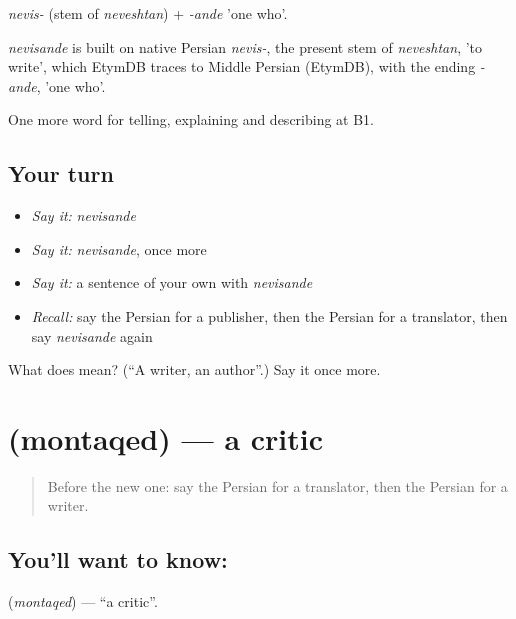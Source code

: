 \emph{nevis-} (stem of \emph{neveshtan}) + \emph{-ande} 'one who'.

\begin{cousinweb}
\emph{nevisande} is built on native Persian \emph{nevis-}, the present stem of \emph{neveshtan}, 'to write', which EtymDB traces to Middle Persian (EtymDB), with the ending \emph{-ande}, 'one who'.
\end{cousinweb}

\begin{grammarlens}[title={What you've built}]
One more word for telling, explaining and describing at B1.
\end{grammarlens}

\subsection*{Your turn}
\begin{itemize}
\raggedright
  \item \emph{Say it:} \emph{nevisande}
  \item \emph{Say it:} \emph{nevisande}, once more
  \item \emph{Say it:} a sentence of your own with \emph{nevisande}
  \item \emph{Recall:} say the Persian for a publisher, then the Persian for a translator, then say \emph{nevisande} again
\end{itemize}

\begin{tcolorbox}[breakable,colback=teal!4,colframe=teal!35!black,title={Before you move on}]
What does  mean? (\textquotedblleft{}A writer, an author\textquotedblright{}.) Say it once more.
\end{tcolorbox}
\section[\texorpdfstring{\fa{منتقد} (montaqed)}{منتقد (montaqed)}]{ (montaqed) — a critic}

\label{lesson:FA-C529-montaqed}



\begin{quote}
Before the new one: say the Persian for a translator, then the Persian for a writer.
\end{quote}

\subsection*{You'll want to know: }
\textbf{} (\emph{montaqed}) — \textquotedblleft{}a critic\textquotedblright{}.

